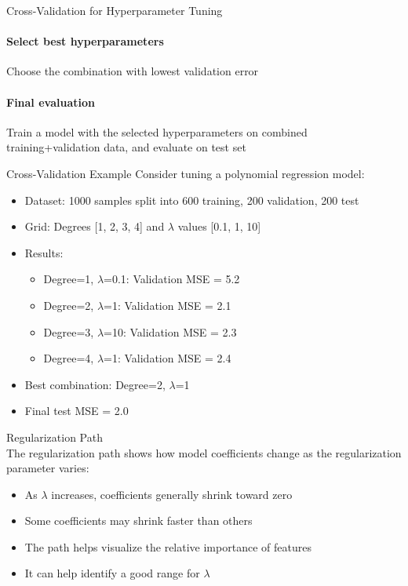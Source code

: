 \begin{KR}{Cross-Validation for Hyperparameter Tuning}
\paragraph{Select best hyperparameters}
Choose the combination with lowest validation error

\paragraph{Final evaluation}
Train a model with the selected hyperparameters on combined training+validation data, and evaluate on test set
\end{KR}

\begin{example}{Cross-Validation Example}
Consider tuning a polynomial regression model:
\begin{itemize}
    \item Dataset: 1000 samples split into 600 training, 200 validation, 200 test
    \item Grid: Degrees [1, 2, 3, 4] and $\lambda$ values [0.1, 1, 10]
    \item Results:
    \begin{itemize}
        \item Degree=1, $\lambda$=0.1: Validation MSE = 5.2
        \item Degree=2, $\lambda$=1: Validation MSE = 2.1
        \item Degree=3, $\lambda$=10: Validation MSE = 2.3
        \item Degree=4, $\lambda$=1: Validation MSE = 2.4
    \end{itemize}
    \item Best combination: Degree=2, $\lambda$=1
    \item Final test MSE = 2.0
\end{itemize}
\end{example}

\begin{concept}{Regularization Path}\\
The regularization path shows how model coefficients change as the regularization parameter varies:
\begin{itemize}
    \item As $\lambda$ increases, coefficients generally shrink toward zero
    \item Some coefficients may shrink faster than others
    \item The path helps visualize the relative importance of features
    \item It can help identify a good range for $\lambda$
\end{itemize}
\end{concept}